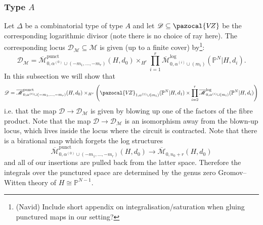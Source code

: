 \documentclass[11pt]{amsart}
\newcommand{\sqC}{\scalebox{0.8}[1.3]{$\sqsubset$}}
\newcommand{\M}[4]{\overline{\mathcal{M}}_{#1,#2}(#3,#4)}
\newcommand{\Mlog}[4]{\overline{\mathcal{M}}^{\operatorname{log}}_{#1,#2}(#3,#4)}
\newcommand{\Mpunct}[4]{\overline{\mathcal{M}}^{\operatorname{punct}}_{#1,#2}(#3,#4)}
\newcommand{\PP}{\mathbb P}
\newcommand{\VZ}{\pazocal{V\!Z}}
\renewcommand{\to}{\rightarrow}
\newcommand{\Mcal}{\mathcal{M}}
\newcommand{\Dcal}{\mathcal{D}}
\theoremstyle{definition}
\theoremstyle{definition}
\begin{document}
\subsubsection{Type $A$} Let $\Delta$ be a combinatorial type of type $A$ and let $\Dcal\subseteq\VZ$ be the corresponding logarithmic divisor (note there is no choice of ray here). The corresponding locus $\Dcal_\Mcal\subseteq\Mcal$ is given (up to a finite cover) by\footnote{(Navid) Include short appendix on integralisation/saturation when gluing punctured maps in our setting?}:
\begin{equation*}\Dcal_\Mcal=\Mpunct{0}{\alpha^{(0)}\cup (-m_1,\ldots,-m_r)}{H}{d_0}\times_{H^r}\prod_{i=1}^r\Mlog{0}{\alpha^{(i)}\cup(m_i)}{\PP^N|H}{d_i}. \end{equation*}
In this subsection we will show that
\begin{equation}\label{type A splitting axiom}\Dcal=\Mpunct{0}{\alpha^{(0)}\cup (-m_1,\ldots,-m_r)}{H}{d_0}\times_{H^r}\left(\VZ_{1,\alpha^{(1)}\cup(m_1)}(\PP^N|H,d_1)\times\prod_{i=2}^r\Mlog{0}{\alpha^{(i)}\cup(m_i)}{\PP^N|H}{d_i}\right) \end{equation}
i.e. that the map $\Dcal\to\Dcal_\Mcal$ is given by blowing up one of the factors of the fibre product. Note that the map $\Dcal\to\Dcal_\Mcal$ is an isomorphism away from the blown-up locus, which lives inside the locus where the circuit is contracted. Note that there is a birational map which forgets the log structures
\begin{equation*} \Mpunct{0}{\alpha^{(0)}\cup(-m_1,\ldots,-m_r)}{H}{d_0} \to \M{0}{n_0+r}{H}{d_0} \end{equation*}
and all of our insertions are pulled back from the latter space. Therefore the integrals over the punctured space are determined by the genus zero Gromov--Witten theory of $H\cong\PP^{N-1}$.


\end{document}
